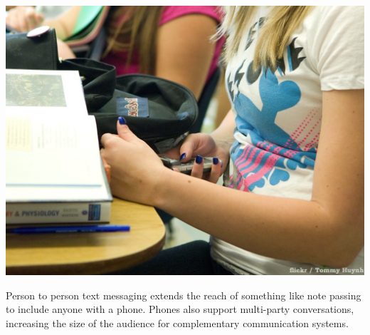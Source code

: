 \begin{marginfigure}
	\includegraphics{figures/texting.png}
	\caption{Person to person text messaging extends the reach of something like note passing to include anyone with a phone. Phones also support multi-party conversations, increasing the size of the audience for complementary communication systems.}
	\label{fig:texting}
\end{marginfigure}







